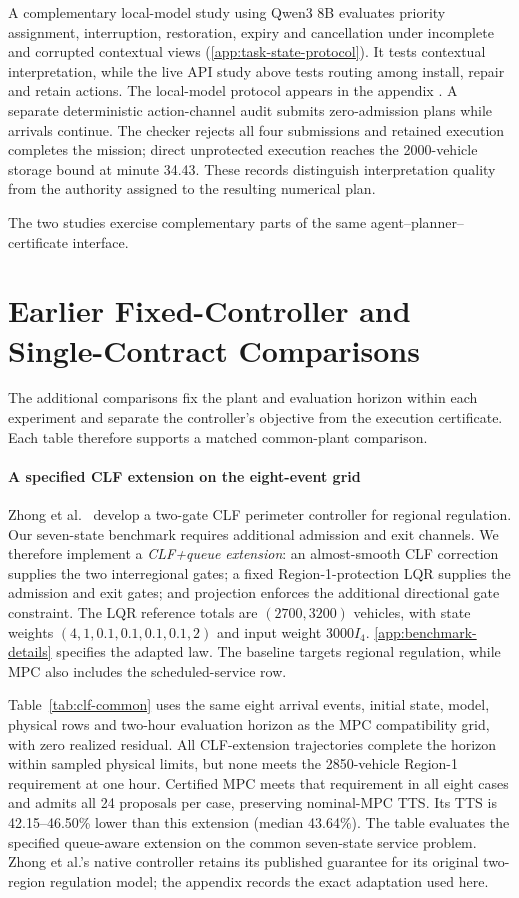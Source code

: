 \documentclass[preprint,12pt]{elsarticle}
\newcommand{\appref}[1]{\ref{#1}}
\numberwithin{equation}{section}
\begin{document}
A complementary local-model study using Qwen3 8B evaluates
priority assignment, interruption, restoration, expiry and cancellation
under incomplete and corrupted contextual views
(\appref{app:task-state-protocol}). It tests contextual interpretation,
while the live API study above tests routing among install, repair and
retain actions. The local-model protocol appears in the appendix
\cite{qwen3technical}. A separate deterministic
action-channel audit submits zero-admission plans while arrivals continue.
The checker rejects all four submissions and retained execution completes the
mission; direct unprotected execution reaches the 2000-vehicle storage bound
at minute 34.43. These records distinguish interpretation quality from the
authority assigned to the resulting numerical plan.

The two studies exercise complementary parts of the same
agent--planner--certificate interface.

\FloatBarrier
\section{Earlier Fixed-Controller and Single-Contract Comparisons}
\label{app:earlier-benchmarks}


The additional comparisons fix the plant and evaluation horizon within each
experiment and separate the controller's objective from the execution
certificate. Each table therefore supports a matched common-plant comparison.

\paragraph{A specified CLF extension on the eight-event grid}
Zhong et al.\ \cite{zhong2018robust} develop a two-gate CLF perimeter
controller for regional regulation. Our seven-state benchmark requires
additional admission and exit channels. We therefore implement a
\emph{CLF+queue extension}: an almost-smooth CLF correction supplies the two
interregional gates; a fixed Region-1-protection LQR supplies the admission
and exit gates; and projection enforces the additional directional gate
constraint. The LQR reference totals are $(2700,3200)$ vehicles, with
state weights $(4,1,0.1,0.1,0.1,0.1,2)$ and input weight $3000I_4$.
\appref{app:benchmark-details} specifies the adapted law. The baseline targets
regional regulation, while MPC also includes the scheduled-service row.

Table~\ref{tab:clf-common} uses the same eight arrival events, initial
state, model, physical rows and two-hour evaluation horizon as the MPC compatibility grid, with zero realized residual. All CLF-extension
trajectories complete the horizon within sampled physical limits, but none
meets the 2850-vehicle Region-1 requirement at one hour. Certified MPC meets
that requirement in all eight cases and admits all 24 proposals per case,
preserving nominal-MPC TTS. Its TTS is 42.15--46.50\% lower than this
extension (median 43.64\%). The table evaluates the specified queue-aware
extension on the common seven-state service problem. Zhong et al.'s native
controller retains its published guarantee for its original two-region
regulation model; the appendix records the exact adaptation used here.
\end{document}
